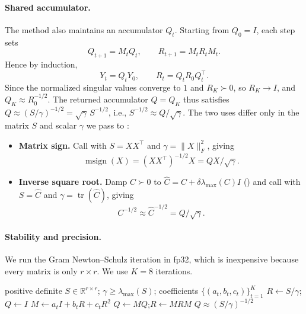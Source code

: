 \documentclass[11pt]{article}
\DeclareMathOperator{\Tr}{tr}
\DeclareMathOperator{\msign}{msign}
\newcommand{\norm}[1]{\| #1\|}
\theoremstyle{plain}
\theoremstyle{definition}
\theoremstyle{remark}
\theoremstyle{definition}
\begin{document}
\paragraph{Shared accumulator.}
The method also maintains an accumulator $Q_t$.  Starting from
$Q_0=I$, each step sets
\[
    Q_{t+1}=M_t Q_t,
    \qquad
    R_{t+1}=M_t R_t M_t .
\]
Hence by induction,
\[
    Y_t=Q_tY_0,
    \qquad
    R_t=Q_tR_0Q_t^\top .
\]
Since the normalized singular values converge to $1$
and $R_K\succ 0$, so $R_K\to I$, and
$Q_K\approx R_0^{-1/2}$.  The returned accumulator $Q=Q_K$ thus satisfies
$Q\approx(S/\gamma)^{-1/2}=\sqrt{\gamma}\,S^{-1/2}$, i.e., $S^{-1/2}\approx Q/\sqrt{\gamma}$.
The two uses differ only in the matrix $S$ and scalar $\gamma$ we pass to
:

\begin{itemize}[leftmargin=1.5em,itemsep=2pt,topsep=2pt]
    \item \textbf{Matrix sign.}
    Call  with $S=XX^\top$ and $\gamma=\norm{X}_F^2$, giving
    \[
        \msign(X)=(XX^\top)^{-1/2}X=QX/\sqrt{\gamma}.
    \]
    \item \textbf{Inverse square root.}
    Damp $C\succ 0$ to $\widehat{C}=C+\delta\lambda_{\max}(C)I$ () and
    call  with $S=\widehat{C}$ and $\gamma=\Tr(\widehat{C})$, giving
    \[
        C^{-1/2}\approx\widehat{C}^{-1/2}=Q/\sqrt{\gamma}.
    \]
\end{itemize}



\paragraph{Stability and precision.}
We run the Gram Newton--Schulz iteration in fp32, which is inexpensive because
every matrix is only $r\times r$.  We use $K=8$ iterations.


\begin{algorithm}[ht]
\caption{Gram Newton--Schulz iteration}
\label{alg:gramns}
\begin{algorithmic}[1]
\Require positive definite $S \in \mathbb{R}^{r \times r}$; $\gamma \ge \lambda_{\max}(S)$; coefficients $\{(a_t,b_t,c_t)\}_{t=1}^{K}$
\Statex\vspace{-0.5\baselineskip}
\State $R\gets S/\gamma$;\quad $Q\gets I$ 
  \State $M\gets a_t I+b_t R+c_t R^2$
  \State $Q\gets M Q$;\quad $R\gets M R M$
\EndFor
\State \Return $Q\approx (S/\gamma)^{-1/2}$
\end{algorithmic}
\end{algorithm}
\end{document}
